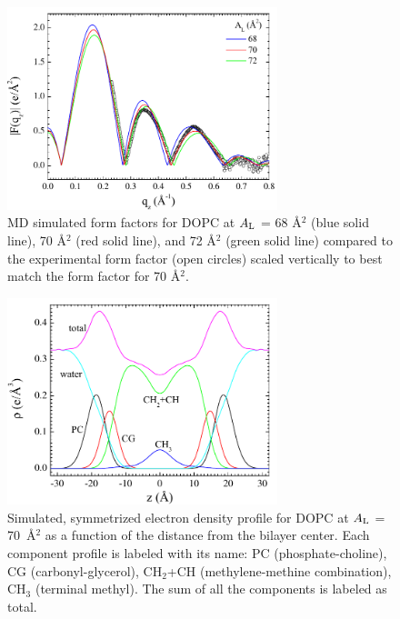 \begin{figure}[p]
  \centering
  \includegraphics[width=0.7\textwidth]{figures/Tat/MD_Results/xff/dopc_sim-exp}
  \caption{MD simulated form factors for DOPC at $A_\textrm{L}$ = 68 \AA$^2$ (blue solid line), 
  70 \AA$^2$ (red solid line), and 72 \AA$^2$ (green solid line)
  compared to the experimental form factor (open circles) scaled vertically
  to best match the form factor for 70 \AA$^2$.}
  \label{fig:MD_dopc_sim-exp}
\end{figure}

\begin{figure}[p]
  \centering
  \includegraphics[width=0.7\textwidth]{figures/Tat/MD_Results/edp/dopc_70_PC-CG}
  \caption{Simulated, symmetrized electron density profile for DOPC at 
  $A_\textrm{L}$ = 70~\AA$^2$ as a function of the distance from the bilayer center. 
  Each component profile is labeled with its name: PC (phosphate-choline),
  CG (carbonyl-glycerol), CH$_2$+CH (methylene-methine combination), 
  CH$_3$ (terminal methyl). The sum of all the components is labeled as total.}
  \label{fig:MD_dopc_70_PC-CG}
\end{figure}

